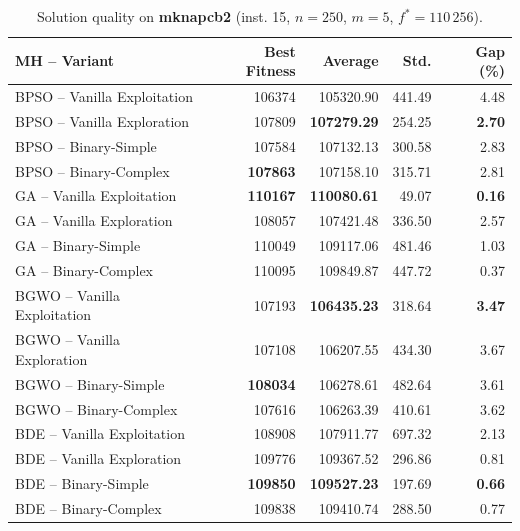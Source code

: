 \documentclass[journal,article,submit,moreauthors]{Definitions/mdpi}
\begin{document}
\begin{table}[htbp]
  \centering
  \small
  \caption{Solution quality on \textbf{mknapcb2} (inst. 15, $n=250$, $m=5$, $f^*=110\,256$).}
  \label{tab:calidad_mknapcb2_15}
  \begin{tabular}{lrrrr}
    \toprule
    \textbf{MH -- Variant} &
    \textbf{Best Fitness} &
    \textbf{Average} &
    \textbf{Std.} &
    \textbf{Gap (\%)} \\
    \midrule
    BPSO -- Vanilla Exploitation &         106374 &        105320.90 & 441.49 &         4.48 \\
    BPSO -- Vanilla Exploration  &         107809 & \textbf{107279.29} & 254.25 & \textbf{2.70} \\
    BPSO -- Binary-Simple        &         107584 &        107132.13 & 300.58 &         2.83 \\
    BPSO -- Binary-Complex       & \textbf{107863} &        107158.10 & 315.71 &         2.81 \\
    \midrule
    GA -- Vanilla Exploitation   & \textbf{110167} & \textbf{110080.61} &  49.07 & \textbf{0.16} \\
    GA -- Vanilla Exploration    &         108057 &        107421.48 & 336.50 &         2.57 \\
    GA -- Binary-Simple          &         110049 &        109117.06 & 481.46 &         1.03 \\
    GA -- Binary-Complex         &         110095 &        109849.87 & 447.72 &         0.37 \\
    \midrule
    BGWO -- Vanilla Exploitation &         107193 & \textbf{106435.23} & 318.64 & \textbf{3.47} \\
    BGWO -- Vanilla Exploration  &         107108 &        106207.55 & 434.30 &         3.67 \\
    BGWO -- Binary-Simple        & \textbf{108034} &        106278.61 & 482.64 &         3.61 \\
    BGWO -- Binary-Complex       &         107616 &        106263.39 & 410.61 &         3.62 \\
    \midrule
    BDE -- Vanilla Exploitation  &         108908 &        107911.77 & 697.32 &         2.13 \\
    BDE -- Vanilla Exploration   &         109776 &        109367.52 & 296.86 &         0.81 \\
    BDE -- Binary-Simple         & \textbf{109850} & \textbf{109527.23} & 197.69 & \textbf{0.66} \\
    BDE -- Binary-Complex        &         109838 &        109410.74 & 288.50 &         0.77 \\
    \bottomrule
  \end{tabular}
\end{table}
\end{document}
